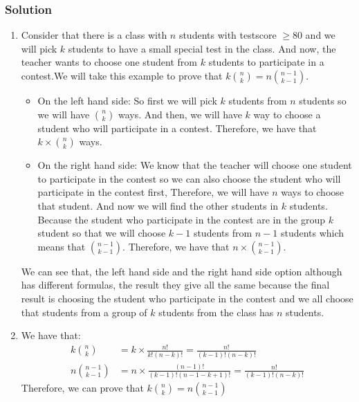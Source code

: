 \documentclass{article}
\theoremstyle{mytheoremstyle}
\theoremstyle{mytheoremstyle}
\theoremstyle{myproblemstyle}
\begin{document}
    \subsubsection*{Solution}
    \begin{enumerate} [label = (\alph*)]
        \item Consider that there is a class with \(n\) students with testscore \(\geq 80\) and we will pick \(k\) students to have a small special test in the class. And now, the teacher wants to choose one student from \(k\) students to participate in a
        contest.We will take this example to prove that \(k\binom{n}{k} = n\binom{n - 1}{k - 1}\).
        \begin{itemize}
            \item On the left hand side: So first we will pick \(k\) students from \(n\) students so we will have
            \(\binom{n}{k}\) ways. And then, we will have \(k\) way to choose a student who will participate in a contest.
            Therefore, we have that \(k \times \binom{n}{k}\) ways.
            \item On the right hand side: We know that the teacher will choose one student to participate in the contest so we can also choose
            the student who will participate in the contest first, Therefore, we will have \(n\) ways to choose that student. And now we will find
            the other students in \(k\) students. Because the student who participate in the contest are in the group \(k\) student so that we will choose \(k - 1\) students
            from \(n - 1\) students which means that \(\binom{n - 1}{k - 1}\). Therefore, we have that \(n \times \binom{n - 1}{k - 1}\).
        \end{itemize}
        We can see that, the left hand side and the right hand side option although has different formulas, the result they give all the same
        because the final result is choosing the student who participate in the contest and we all choose that students from a group of \(k\) students from the class has \(n\) students.
        \item We have that:
        \begin{align*}
            k\binom{n}{k} &= k \times \frac{n!}{k!(n - k)!} = \frac{n!}{(k - 1)!(n - k)!}\\
            n\binom{n - 1}{k - 1} &= n \times \frac{(n - 1)!}{(k - 1)!(n - 1 - k + 1)!}  = \frac{n!}{(k - 1)!(n - k)!}
        \end{align*}
        Therefore, we can prove that \(k\binom{n}{k} = n\binom{n - 1}{k - 1}\)
    \end{enumerate}
\end{document}
